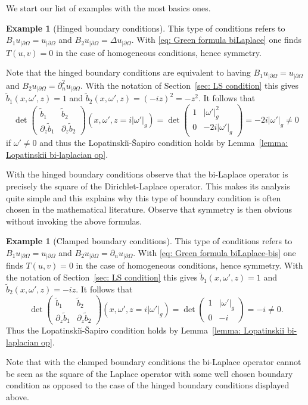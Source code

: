 \documentclass[10pt]{amsart}
\theoremstyle{plain}
\theoremstyle{definition}
\newtheorem{example}[theorem]{Example}
\newcommand{\LS}{Lopatinski\u{\i}-\v{S}apiro\xspace}
\newcommand{\bd}{\ensuremath{_{|\partial\Omega}}}
\begin{document}
We start our list of examples with the most basics ones.

\begin{example}[Hinged boundary conditions]
\label{ex: hinged boundary conditions}
This type of conditions refers to $B_1 u\bd = u\bd$ and $B_2 u\bd
= \Delta u\bd$. With \eqref{eq: Green formula biLaplace} one finds
$T(u,v) =0$ in the case of homogeneous conditions, hence symmetry.

Note that the hinged boundary conditions are equivalent to having
$B_1 u\bd = u\bd$ and $B_2 u\bd
= \partial_n^2 u\bd$.
With the notation of Section~\ref{sec: LS condition} this gives
$\tilde{b}_1(x,\omega',z)=1$ and $\tilde{b}_2(x,\omega',z)=(-iz)^2 =
-z^2$. It follows that
\begin{equation*}
\det
\begin{pmatrix}
\tilde{b}_1 &\tilde{b}_2 \\[
2pt]
\partial_z\tilde{b}_1& \partial_z\tilde{b}_2
\end{pmatrix} (x,\omega',z=i|\omega'|_g)
=
\det
\begin{pmatrix}
1 &|\omega'|^2_g \\[
2pt]
0&-2i|\omega'|_g
\end{pmatrix} =-2i|\omega'|_g \neq 0
\end{equation*}
if $\omega'\neq 0$ and thus the \LS condition holds by Lemma~\ref{lemma: Lopatinskii bi-laplacian op}.

With the hinged boundary conditions observe that the bi-Laplace operator is precisely
the square of the Dirichlet-Laplace operator. This makes its analysis
quite simple and this explains why this type of boundary condition is
often chosen in the mathematical literature. Observe that symmetry is
then obvious without invoking the above formulas.
\end{example}

\begin{example}[Clamped boundary conditions]
This type of conditions refers to $B_1 u\bd = u\bd$ and $B_2 u\bd
= \partial_n u\bd$. With \eqref{eq: Green formula biLaplace-bis} one finds
$T(u,v) =0$ in the case of homogeneous conditions, hence symmetry.
With the notation of Section~\ref{sec: LS condition} this gives
$\tilde{b}_1(x,\omega',z)=1$ and $\tilde{b}_2(x,\omega',z)=-iz$. It follows that
\begin{equation*}
\det
\begin{pmatrix}
\tilde{b}_1 &\tilde{b}_2 \\[
2pt]
\partial_z\tilde{b}_1& \partial_z\tilde{b}_2
\end{pmatrix} (x,\omega',z=i|\omega'|_g)
=
\det
\begin{pmatrix}
1 &|\omega'|_g \\[
2pt]
0&-i
\end{pmatrix} =-i \neq 0.
\end{equation*}
Thus the \LS condition holds by Lemma~\ref{lemma: Lopatinskii bi-laplacian op}.

Note that with the clamped boundary conditions the bi-Laplace operator
cannot be seen as the square
of the Laplace operator with some well chosen boundary condition as
opposed to the case of the hinged boundary conditions displayed
above.
\end{example}
\end{document}
